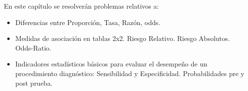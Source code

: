 \documentclass[
]{book}
\providecommand{\tightlist}{%
  \setlength{\itemsep}{0pt}\setlength{\parskip}{0pt}}
\begin{document}
En este capítulo se resolverán problemas relativos a:

\begin{itemize}
\tightlist
\item
  Diferencias entre Proporción, Tasa, Razón, odds.
\item
  Medidas de asociación en tablas 2x2. Riesgo Relativo. Riesgo Absolutos. Odds-Ratio.
\item
  Indicadores estadísticos básicos para evaluar el desempeño de un procedimiento diagnóstico: Sensibilidad y Especificidad. Probabilidades pre y post prueba.
\end{itemize}

  
\end{document}
